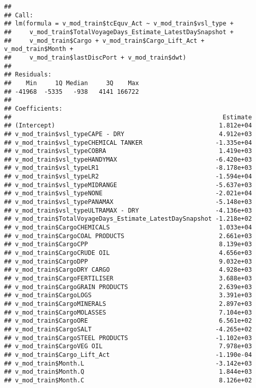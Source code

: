 \documentclass[]{article}
\begin{document}
\begin{verbatim}
## 
## Call:
## lm(formula = v_mod_train$tcEquv_Act ~ v_mod_train$vsl_type + 
##     v_mod_train$TotalVoyageDays_Estimate_LatestDaySnapshot + 
##     v_mod_train$Cargo + v_mod_train$Cargo_Lift_Act + v_mod_train$Month + 
##     v_mod_train$lastDiscPort + v_mod_train$dwt)
## 
## Residuals:
##    Min     1Q Median     3Q    Max 
## -41968  -5335   -938   4141 166722 
## 
## Coefficients:
##                                                          Estimate
## (Intercept)                                             1.812e+04
## v_mod_train$vsl_typeCAPE - DRY                          4.912e+03
## v_mod_train$vsl_typeCHEMICAL TANKER                    -1.335e+04
## v_mod_train$vsl_typeCOBRA                               1.419e+03
## v_mod_train$vsl_typeHANDYMAX                           -6.420e+03
## v_mod_train$vsl_typeLR1                                -8.178e+03
## v_mod_train$vsl_typeLR2                                -1.594e+04
## v_mod_train$vsl_typeMIDRANGE                           -5.637e+03
## v_mod_train$vsl_typeNONE                               -2.021e+04
## v_mod_train$vsl_typePANAMAX                            -5.148e+03
## v_mod_train$vsl_typeULTRAMAX - DRY                     -4.136e+03
## v_mod_train$TotalVoyageDays_Estimate_LatestDaySnapshot -1.218e+02
## v_mod_train$CargoCHEMICALS                              1.033e+04
## v_mod_train$CargoCOAL PRODUCTS                          2.661e+03
## v_mod_train$CargoCPP                                    8.139e+03
## v_mod_train$CargoCRUDE OIL                              4.656e+03
## v_mod_train$CargoDPP                                    9.032e+03
## v_mod_train$CargoDRY CARGO                              4.928e+03
## v_mod_train$CargoFERTILISER                             3.688e+03
## v_mod_train$CargoGRAIN PRODUCTS                         2.639e+03
## v_mod_train$CargoLOGS                                   3.391e+03
## v_mod_train$CargoMINERALS                               2.897e+03
## v_mod_train$CargoMOLASSES                               7.104e+03
## v_mod_train$CargoORE                                    6.561e+02
## v_mod_train$CargoSALT                                  -4.265e+02
## v_mod_train$CargoSTEEL PRODUCTS                        -1.102e+03
## v_mod_train$CargoVEG OIL                                7.978e+03
## v_mod_train$Cargo_Lift_Act                             -1.190e-04
## v_mod_train$Month.L                                    -3.142e+03
## v_mod_train$Month.Q                                     1.844e+03
## v_mod_train$Month.C                                     8.126e+02

\end{verbatim}
\end{document}
